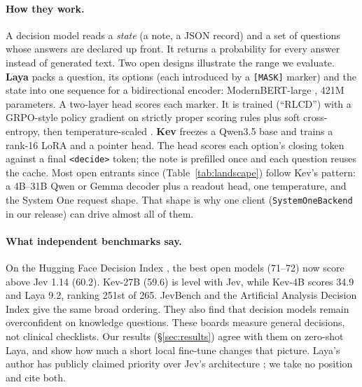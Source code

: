 \documentclass[11pt]{article}
\begin{document}
\paragraph{How they work.}
A decision model reads a \emph{state} (a note, a JSON record) and a set of questions whose answers are declared up front.
It returns a probability for every answer instead of generated text.
Two open designs illustrate the range we evaluate.
\textbf{Laya} \citep{laya2026} packs a question, its options (each introduced by a \texttt{[MASK]} marker) and the state into one sequence for a bidirectional encoder: ModernBERT-large \citep{warner2024modernbert}, 421M parameters.
A two-layer head scores each marker.
It is trained (``RLCD'') with a GRPO-style policy gradient \citep{shao2024grpo} on strictly proper scoring rules \citep{gneiting2007scoring} plus soft cross-entropy, then temperature-scaled \citep{guo2017calibration}.
\textbf{Kev} \citep{kev2026} freezes a Qwen3.5 base and trains a rank-16 LoRA \citep{hu2022lora} and a pointer head.
The head scores each option's closing token against a final \texttt{<decide>} token; the note is prefilled once and each question reuses the cache.
Most open entrants since (Table~\ref{tab:landscape}) follow Kev's pattern: a 4B--31B Qwen or Gemma decoder plus a readout head, one temperature, and the System One request shape.
That shape is why one client (\texttt{SystemOneBackend} in our release) can drive almost all of them.



\paragraph{What independent benchmarks say.}
On the Hugging Face Decision Index \citep{decision_index}, the best open models (71--72) now score above Jev 1.14 (60.2).
Kev-27B (59.6) is level with Jev, while Kev-4B scores 34.9 and Laya 9.2, ranking 251st of 265.
JevBench \citep{jevbench} and the Artificial Analysis Decision Index \citep{aa_decision_index} give the same broad ordering.
They also find that decision models remain overconfident on knowledge questions.
These boards measure general decisions, not clinical checklists. Our results (\S\ref{sec:results}) agree with them on zero-shot Laya, and show how much a short local fine-tune changes that picture.
Laya's author has publicly claimed priority over Jev's architecture \citep{tomshw_dispute}; we take no position and cite both.
\end{document}
